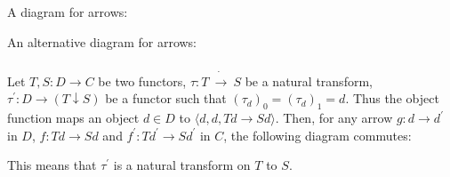 \documentclass[luatex]{article}
\begin{document}
A diagram for arrows:

\begin{center}
\end{center}

An alternative diagram for arrows:

\begin{center}
\end{center}

\subsubsection{}

\showArt

Let $T, S : D \rightarrow C$ be two functors, $\tau : T\ \dot{\rightarrow}\ S$ be a natural transform, $\tau^\prime : D \rightarrow (T \downarrow S)$ be a functor such that $(\tau_d)_0 = (\tau_d)_1 = d$. Thus the object function maps an object $d \in D$ to $\langle d, d, Td \rightarrow Sd \rangle$. Then, for any arrow $g : d \rightarrow d^\prime$ in $D$, $f : Td \rightarrow Sd$ and $f^\prime : Td^\prime \rightarrow Sd^\prime$ in $C$, the following diagram commutes:

\begin{center}
\end{center}

This means that $\tau^\prime$ is a natural transform on $T$ to $S$.

\subsubsection{}
\end{document}
